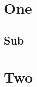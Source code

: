 \documentclass{report}
\begin{document}

\chapter{One}
\section{Sub}
\chapter{Two}

\newpage
\makeatletter
\renewcommand{\@cftmaketoctitle}{
  \addcontentsline{toc}{chapter}{TABLE DES MATIÈRES}
  \begin{center}
    \large\bfseries TABLE DES MATIÈRES
  \end{center}
  \vspace{1cm}
}
\makeatother
\tableofcontents
\end{document}
